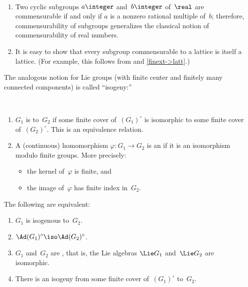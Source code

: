 \begin{egs} \ \label{CommensEg}
\noprelistbreak
 \begin{enumerate}
 \item Two cyclic subgroups $a \integer$
and~$b \integer$ of~$\real$ are commensurable if and
only if $a$ is a nonzero rational multiple of~$b$; therefore,
commensurability of subgroups generalizes the classical
notion of commensurability of real numbers.

 \item \label{CommensEg-latt}
 It is easy to show that every subgroup commensurable
to a lattice is itself a lattice. (For example, this follows from
 and
\cref{finext->latt}.)
 \end{enumerate}
 \end{egs}

The analogous notion for Lie groups (with finite center and finitely many connected components) is called ``isogeny:''

\begin{defns} \  \label{IsogenyDefn}
\noprelistbreak
	\begin{enumerate}
	\item $G_1$ is  to~$G_2$ if some finite cover of~$(G_1)^\circ$ is isomorphic to some finite cover of~$(G_2)^\circ$. This is an equivalence relation.
	\item A (continuous) homomorphism $\varphi \colon G_1 \to G_2$ is an  if it is an isomorphism modulo finite groups. More precisely:
	\begin{itemize}
	\item the kernel of~$\varphi$ is finite,
	and
	\item the image of~$\varphi$ has finite index in~$G_2$.
	\end{itemize}
	\end{enumerate}
\end{defns}

\begin{rem}
The following are equivalent:
	\begin{enumerate}
	\item $G_1$ is isogenous to~$G_2$.
	\item $\Ad (G_1)^\circ \iso \Ad (G_2)^\circ$.
	\item $G_1$ and~$G_2$ are , that is, the Lie
algebras $\Lie G_1$ and~$\Lie G_2$ are isomorphic.
	\item There is an isogeny from some finite cover of~$(G_1)^\circ$ to~$G_2$.
	\end{enumerate}
\end{rem}

